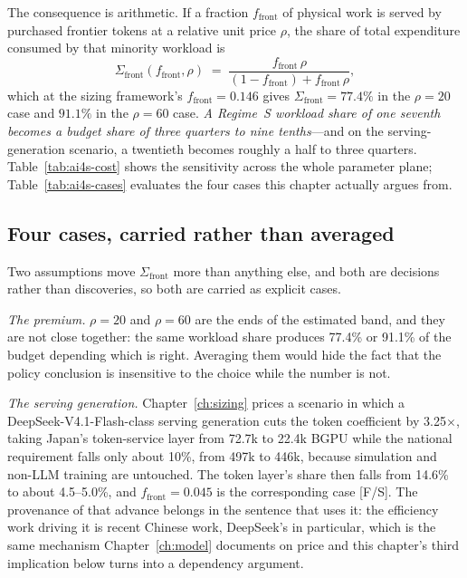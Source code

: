 The consequence is arithmetic. If a fraction $f_{\mathrm{front}}$ of physical work is served by purchased frontier tokens at a relative unit price $\rho$, the share of total expenditure consumed by that minority workload is
\[
\Sigma_{\mathrm{front}}(f_{\mathrm{front}},\rho) \;=\; \frac{f_{\mathrm{front}}\,\rho}{(1-f_{\mathrm{front}}) + f_{\mathrm{front}}\,\rho},
\]
which at the sizing framework's $f_{\mathrm{front}} = 0.146$ gives $\Sigma_{\mathrm{front}} = 77.4\%$ in the $\rho = 20$ case and $91.1\%$ in the $\rho = 60$ case. \emph{A Regime~S workload share of one seventh becomes a budget share of three quarters to nine tenths}---and on the serving-generation scenario, a twentieth becomes roughly a half to three quarters. Table~\ref{tab:ai4s-cost} shows the sensitivity across the whole parameter plane; Table~\ref{tab:ai4s-cases} evaluates the four cases this chapter actually argues from.



\subsection{Four cases, carried rather than averaged}
\label{sec:ai4s-cases}

Two assumptions move $\Sigma_{\mathrm{front}}$ more than anything else, and both are decisions rather than discoveries, so both are carried as explicit cases.

\emph{The premium.} $\rho = 20$ and $\rho = 60$ are the ends of the estimated band, and they are not close together: the same workload share produces 77.4\% or 91.1\% of the budget depending which is right. Averaging them would hide the fact that the policy conclusion is insensitive to the choice while the number is not.

\emph{The serving generation.} Chapter~\ref{ch:sizing} prices a scenario in which a DeepSeek-V4.1-Flash-class serving generation cuts the token coefficient by 3.25$\times$, taking Japan's token-service layer from 72.7k to 22.4k BGPU while the national requirement falls only about 10\%, from 497k to 446k, because simulation and non-LLM training are untouched. The token layer's share then falls from 14.6\% to about 4.5--5.0\%, and $f_{\mathrm{front}} = 0.045$ is the corresponding case [F/S]. The provenance of that advance belongs in the sentence that uses it: the efficiency work driving it is recent Chinese work, DeepSeek's in particular, which is the same mechanism Chapter~\ref{ch:model} documents on price and this chapter's third implication below turns into a dependency argument.


